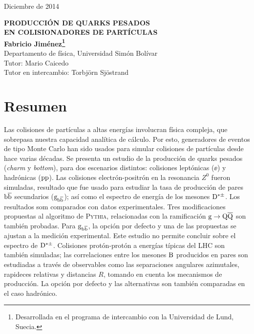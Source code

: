 \documentclass[a4paper,12pt]{article}
\begin{document}
\begin{titlepage}
\begin{flushright}
Diciembre de 2014\\
\end{flushright}
\vfill
\begin{center}

{\large\bf PRODUCCIÓN DE QUARKS PESADOS \\[3mm]
EN COLISIONADORES DE PARTÍCULAS}
\\[3cm]{\bf Fabricio Jiménez\footnote{Desarrollada en el programa de intercambio con la Universidad de Lund, Suecia.}}
\\[5mm]
{Departamento de física, Universidad Simón Bolívar}
\\[2cm]
{Tutor: Mario Caicedo \\ Tutor en intercambio: Torbj\"orn Sj\"ostrand}
\vfill
\section*{Resumen}
\end{center}
Las colisiones de partículas a altas energías involucran física compleja, que sobrepasa nuestra capacidad analítica de cálculo. Por esto, generadores de eventos de tipo Monte Carlo han sido usados para simular colisiones de partículas desde hace varias décadas. Se presenta un estudio de la producción de quarks pesados (\textit{charm} y \textit{bottom}), para dos escenarios distintos: colisiones leptónicas ($\ee$) y hadrónicas (${\mathrm p}{\mathrm p}$). Las colisiones electrón-positrón en la resonancia $Z^0$ fueron simuladas, resultado que fue usado para estudiar la tasa de producción de pares ${\mathrm b}\overline{\mathrm b}$ secundarios (${\mathrm g}_{{\mathrm b}\overline{\mathrm b}}$); así como el espectro de energía de los mesones ${\mathrm D}^{*\pm}$. Los resultados som comparados con datos experimentales. Tres modificaciones propuestas al algoritmo de \textsc{Pythia}, relacionadas con la ramificación ${\mathrm g}\to{\mathrm Q}\overline{\mathrm Q}$ son también probadas. Para ${\mathrm g}_{{\mathrm b}\overline{\mathrm b}}$, la opción por defecto y una de las propuestas se ajustan a la medición experimental. Este estudio no permite concluir sobre el espectro de ${\mathrm D}^{*\pm}$. Colisiones protón-protón a energías típicas del LHC son también simuladas; las correlaciones entre los mesones ${\mathrm B}$ producidos en pares son estudiadas a través de observables como las separaciones angulares azimutales, rapideces relativas y distancias $R$, tomando en cuenta los mecanismos de producción. La opción por defecto y las alternativas son también comparadas en el caso hadrónico.

\end{titlepage}
\end{document}
